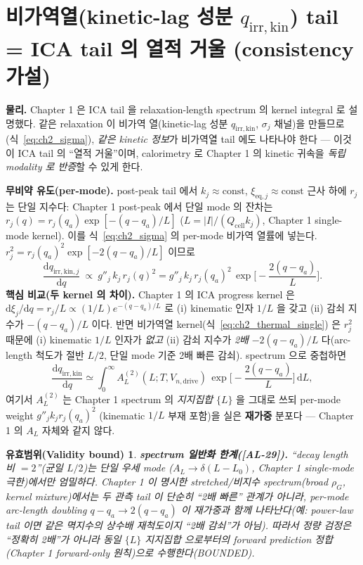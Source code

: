 \documentclass[11pt,a4paper]{article}
\newtheorem*{boundbox}{유효범위(Validity bound)}
\newcommand{\dd}{\mathrm{d}}
\newcommand{\eq}{\mathrm{eq}}
\newcommand{\drive}{\mathrm{drive}}
\newcommand{\cell}{\mathrm{cell}}
\newcommand{\irr}{\mathrm{irr}}
\newcommand{\kin}{\mathrm{kin}}
\newcommand{\AL}[1]{\textsf{[AL-#1]}}
\begin{document}
\section{비가역열(kinetic-lag 성분 $q_{\irr,\kin}$) tail = ICA tail 의 열적 거울 (consistency 가설)}\label{sec:ch2_thermal_tail}
\textbf{물리.} Chapter 1 은 ICA tail 을 relaxation-length spectrum 의 kernel integral 로 설명했다. 같은
relaxation 이 비가역 열(kinetic-lag 성분 $q_{\irr,\kin}$, $\sigma_j$ 채널)을 만들므로(식~\eqref{eq:ch2_sigma}), \emph{같은 kinetic 정보}가 비가역열 tail 에도
나타나야 한다 — 이것이 ICA tail 의 ``열적 거울''이며, calorimetry 로 Chapter 1 의 kinetic 귀속을 \emph{독립
modality 로 반증}할 수 있게 한다.

\textbf{무비약 유도(per-mode).} post-peak tail 에서 $k_j\approx\mathrm{const}$, $\xi_{\eq,j}\approx\mathrm{const}$
근사 하에 $r_j$ 는 단일 지수다: Chapter 1 post-peak 에서 단일 mode 의 잔차는 $r_j(q)=r_j(q_a)\exp[-(q-q_a)/L]$
($L=|I|/(Q_\cell k_j)$, Chapter 1 single-mode kernel). 이를 식~\eqref{eq:ch2_sigma} 의 per-mode 비가역
열률에 넣는다. $r_j^2=r_j(q_a)^2\exp[-2(q-q_a)/L]$ 이므로
\begin{equation}
\frac{\dd q_{\irr,\kin,j}}{\dd q}\ \propto\ g''_j\,k_j\,r_j(q)^2
= g''_j\,k_j\,r_j(q_a)^2\,\exp\!\Big[-\frac{2(q-q_a)}{L}\Big].
\label{eq:ch2_thermal_single}
\end{equation}
\textbf{핵심 비교(두 kernel 의 차이).} Chapter 1 의 ICA progress kernel 은 $\dd\xi_j/\dd q=r_j/L\propto(1/L)e^{-(q-q_a)/L}$
로 (i) kinematic 인자 $1/L$ 을 갖고 (ii) 감쇠 지수가 $-(q-q_a)/L$ 이다. 반면 비가역열 kernel(식~\eqref{eq:ch2_thermal_single})
은 $r_j^2$ 때문에 (i) kinematic $1/L$ 인자가 \emph{없고} (ii) 감쇠 지수가 \emph{2배} $-2(q-q_a)/L$ 다(arc-length
척도가 절반 $L/2$, 단일 mode 기준 2배 빠른 감쇠). spectrum 으로 중첩하면
\begin{equation}
\boxed{\;\frac{\dd q_{\irr,\kin}}{\dd q}\simeq\int_0^\infty A_L^{(2)}(L;T,V_{n,\drive})\,
\exp\!\Big[-\frac{2(q-q_a)}{L}\Big]\,\dd L,\;}
\label{eq:ch2_thermal_kernel}
\end{equation}
여기서 $A_L^{(2)}$ 는 Chapter 1 spectrum 의 \emph{지지집합} $\{L\}$ 을 그대로 쓰되 per-mode weight $g''_j k_j r_j(q_a)^2$
(kinematic $1/L$ 부재 포함)을 실은 \textbf{재가중} 분포다 — Chapter 1 의 $A_L$ 자체와 같지 않다.
\begin{boundbox}
\textbf{spectrum 일반화 한계(\AL{29}).} ``decay length 비 $=2$''(균일 $L/2$)는 \emph{단일 우세 mode}
($A_L\to\delta(L-L_0)$, Chapter 1 single-mode 극한)에서만 엄밀하다. Chapter 1 이 명시한 stretched/비지수
spectrum(broad $\rho_G$, kernel mixture)에서는 두 관측 tail 이 단순히 ``2배 빠른'' 관계가 아니라, per-mode
arc-length doubling $q-q_a\to2(q-q_a)$ 이 \emph{재가중}과 함께 나타난다(예: power-law tail 이면 같은 멱지수의
상수배 재척도이지 ``2배 감쇠''가 아님). 따라서 정량 검정은 ``정확히 2배''가 아니라 \emph{동일 $\{L\}$ 지지집합
으로부터의 forward prediction 정합}(Chapter 1 forward-only 원칙)으로 수행한다(BOUNDED).
\end{boundbox}
\end{document}
